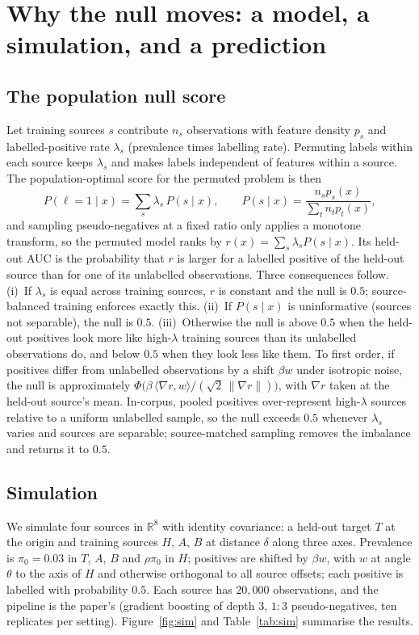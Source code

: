 \documentclass[11pt]{article}
\begin{document}
\section{Why the null moves: a model, a simulation, and a prediction}\label{sec:mechanism}

\subsection{The population null score}
Let training sources $s$ contribute $n_s$ observations with feature density $p_s$
and labelled-positive rate $\lambda_s$ (prevalence times labelling rate). Permuting
labels within each source keeps $\lambda_s$ and makes labels independent of
features within a source. The population-optimal score for the permuted problem is
then
\begin{equation}
P(\ell=1\mid x)=\sum_s \lambda_s\,P(s\mid x),\qquad P(s\mid x)=\frac{n_s p_s(x)}{\sum_{t} n_t p_t(x)},\label{eq:null}
\end{equation}
and sampling pseudo-negatives at a fixed ratio only applies a monotone transform,
so the permuted model ranks by $r(x)=\sum_s\lambda_s P(s\mid x)$. Its held-out AUC is
the probability that $r$ is larger for a labelled positive of the held-out source
than for one of its unlabelled observations. Three consequences follow.
(i)~If $\lambda_s$ is equal across training sources, $r$ is constant and the null is
$0.5$; source-balanced training enforces exactly this. (ii)~If $P(s\mid x)$ is
uninformative (sources not separable), the null is $0.5$. (iii)~Otherwise the null
is above $0.5$ when the held-out positives look more like high-$\lambda$ training
sources than its unlabelled observations do, and below $0.5$ when they look less
like them. To first order, if positives differ from unlabelled observations by a
shift $\beta w$ under isotropic noise, the null is approximately
$\Phi\big(\beta\,\langle\nabla r,w\rangle/(\sqrt2\,\lVert\nabla r\rVert)\big)$, with
$\nabla r$ taken at the held-out source's mean. In-corpus, pooled positives
over-represent high-$\lambda$ sources relative to a uniform unlabelled sample, so the
null exceeds $0.5$ whenever $\lambda_s$ varies and sources are separable;
source-matched sampling removes the imbalance and returns it to $0.5$.

\subsection{Simulation}
We simulate four sources in $\mathbb{R}^8$ with identity covariance: a held-out
target $T$ at the origin and training sources $H$, $A$, $B$ at distance $\delta$
along three axes. Prevalence is $\pi_0=0.03$ in $T$, $A$, $B$ and $\rho\pi_0$ in $H$;
positives are shifted by $\beta w$, with $w$ at angle $\theta$ to the axis of $H$
and otherwise orthogonal to all source offsets; each positive is labelled with
probability $0.5$. Each source has $20{,}000$ observations, and the pipeline is the
paper's (gradient boosting of depth 3, $1{:}3$ pseudo-negatives, ten replicates per
setting). Figure~\ref{fig:sim} and Table~\ref{tab:sim} summarise the results.
\end{document}
